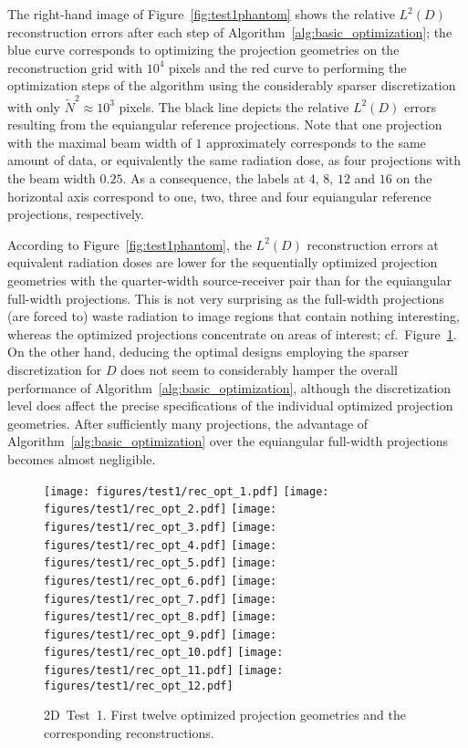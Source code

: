 \documentclass[final]{siamltex}
\begin{document}
The right-hand image of Figure~\ref{fig:test1phantom} shows the relative $L^2(D)$ reconstruction errors after each step of Algorithm~\ref{alg:basic_optimization};
the blue curve corresponds to optimizing the projection geometries on the reconstruction grid with $10^4$ pixels and the red curve to performing the optimization steps of the algorithm using the considerably sparser discretization with only $\tilde{N}^2 \approx 10^3$ pixels. The black line depicts the relative $L^2(D)$ errors resulting from the equiangular reference projections. Note that one projection with the maximal beam width of $1$
approximately corresponds to the same amount of data, or equivalently the same radiation dose, as four projections with the beam width $0.25$. As a consequence, the labels at $4$, $8$, $12$ and $16$ on the horizontal axis correspond to one, two, three and four equiangular reference projections, respectively.

According to Figure~\ref{fig:test1phantom}, the $L^2(D)$ reconstruction errors at equivalent radiation doses are lower for the sequentially optimized projection geometries with the quarter-width source-receiver pair than for the equiangular full-width projections. This is not very surprising as the full-width projections (are forced to) waste radiation to image regions that contain nothing interesting, whereas the optimized projections concentrate on areas of interest; cf.~Figure~\ref{fig:test1reconstructions}. On the other hand, deducing the optimal designs employing the sparser discretization for $D$ does not seem to considerably hamper the overall performance of Algorithm~\ref{alg:basic_optimization}, although the discretization level does affect the precise specifications of the individual optimized projection geometries. After sufficiently many projections, the advantage of Algorithm~\ref{alg:basic_optimization} over the equiangular full-width projections becomes almost negligible.

\begin{figure}
	\centering
  \texttt{[image: figures/test1/rec\_opt\_1.pdf]}
  \texttt{[image: figures/test1/rec\_opt\_2.pdf]}
  \texttt{[image: figures/test1/rec\_opt\_3.pdf]}
  \texttt{[image: figures/test1/rec\_opt\_4.pdf]}
  \texttt{[image: figures/test1/rec\_opt\_5.pdf]}
  \texttt{[image: figures/test1/rec\_opt\_6.pdf]}
  \texttt{[image: figures/test1/rec\_opt\_7.pdf]}
  \texttt{[image: figures/test1/rec\_opt\_8.pdf]}
  \texttt{[image: figures/test1/rec\_opt\_9.pdf]}
  \texttt{[image: figures/test1/rec\_opt\_10.pdf]}
  \texttt{[image: figures/test1/rec\_opt\_11.pdf]}
   \texttt{[image: figures/test1/rec\_opt\_12.pdf]}
	\caption{{\sc 2D~Test~1.} First twelve optimized projection geometries and the corresponding reconstructions.}
	\label{fig:test1reconstructions}
\end{figure}
\end{document}
